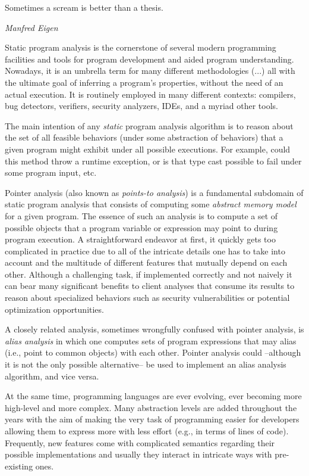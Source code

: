\label{chapter:intro}

\epigraph{Sometimes a scream is better than a thesis.}{\textit{Manfred Eigen}}

Static program analysis is the cornerstone of several modern programming
facilities and tools for program development and aided program understanding.
Nowadays, it is an umbrella term for many different methodologies (...) all
with the ultimate goal of inferring a program's properties, without the need of
an actual execution. It is routinely employed in many different contexts:
compilers, bug detectors, verifiers, security analyzers, IDEs, and a myriad
other tools. 

The main intention of any \emph{static} program analysis algorithm is to reason
about the set of all feasible behaviors (under some abstraction of behaviors)
that a given program might exhibit under all possible executions. For example,
could this method throw a runtime exception, or is that type cast possible to
fail under some program input, etc.

Pointer analysis (also known as \emph{points-to analysis}) is a fundamental
subdomain of static program analysis that consists of computing some
\emph{abstract memory model} for a given program. The essence of such an
analysis is to compute a set of possible objects that a program variable or
expression may point to during program execution. A straightforward endeavor at
first, it quickly gets too complicated in practice due to all of the intricate
details one has to take into account and the multitude of different features
that mutually depend on each other. Although a challenging task, if implemented
correctly and not naively it can bear many significant benefits to client
analyses that consume its results to reason about specialized behaviors such as
security vulnerabilities or potential optimization opportunities.

A closely related analysis, sometimes wrongfully confused with pointer
analysis, is \emph{alias analysis} in which one computes sets of program
expressions that may alias (i.e., point to common objects) with each other.
Pointer analysis could --although it is not the only possible alternative-- be
used to implement an alias analysis algorithm, and vice versa.

At the same time, programming languages are ever evolving, ever becoming more
high-level and more complex. Many abstraction levels are added throughout the
years with the aim of making the very task of programming easier for developers
allowing them to express more with less effort (e.g., in terms of lines of
code). Frequently, new features come with complicated semantics regarding their
possible implementations and usually they interact in intricate ways with
pre-existing ones.

